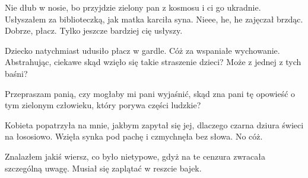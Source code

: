 \begin{dialogue}
	\ds{} Nie dłub w nosie, bo przyjdzie zielony pan z kosmosu i ci go ukradnie. \dm{} Usłyszałem za biblioteczką, jak matka karciła syna.
	\ds{} Nieee, he, he \dm{} zajęczał brzdąc.
	\ds{} Dobrze, płacz. Tylko jeszcze bardziej cię usłyszy.
\end{dialogue}

Dziecko natychmiast udusiło płacz w gardle.
Cóż za wspaniałe wychowanie.
Abstrahując, ciekawe skąd wzięło się takie straszenie dzieci? Może z jednej z tych baśni?

\begin{dialogue}
	\ds{} Przepraszam panią, czy mogłaby mi pani wyjaśnić, skąd zna pani tę opowieść o tym zielonym człowieku, który porywa części ludzkie?
\end{dialogue}

Kobieta popatrzyła na mnie, jakbym zapytał się jej, dlaczego czarna dziura świeci na łososiowo.
Wzięła synka pod pachę i czmychnęła bez słowa.
No cóż.

Znalazłem jakiś wiersz, co było nietypowe, gdyż na te cenzura zwracała szczególną uwagę. 
Musiał się zaplątać w reszcie bajek.

